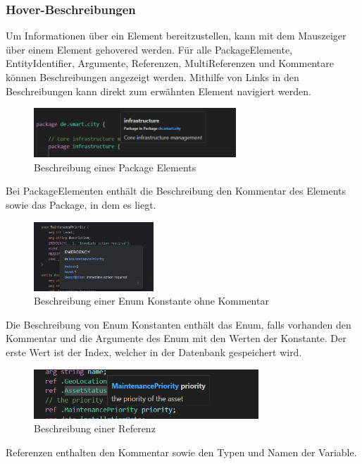 \documentclass[./einleitung.tex]{subfiles}
\begin{document}
    \subsubsection{Hover-Beschreibungen}\label{subsubsec:useHover}
    Um Informationen über ein Element bereitzustellen, kann mit dem Mauszeiger über einem Element gehovered werden.
    Für alle PackageElemente, EntityIdentifier, Argumente, Referenzen, MultiReferenzen und Kommentare können Beschreibungen angezeigt werden.
    Mithilfe von Links in den Beschreibungen kann direkt zum erwähnten Element navigiert werden.
    \begin{figure}[H]
        \centering
        \includegraphics[height=5em]{bilder/hover-package}
        \caption{Beschreibung eines Package Elements}
        \label{fig:hover-package}
    \end{figure}
    Bei PackageElementen enthält die Beschreibung den Kommentar des Elements sowie das Package, in dem es liegt.
    \begin{figure}[H]
        \centering
        \includegraphics[height=7em]{bilder/hover-enum-entry}
        \caption{Beschreibung einer Enum Konstante ohne Kommentar}
        \label{fig:hover-enum-entry}
    \end{figure}
    Die Beschreibung von Enum Konstanten enthält das Enum, falls vorhanden den Kommentar und die Argumente des Enum mit den Werten der Konstante.
    Der erste Wert ist der Index, welcher in der Datenbank gespeichert wird.
    \begin{figure}[H]
        \centering
        \includegraphics[height=5em]{bilder/hover-referenz}
        \caption{Beschreibung einer Referenz}
        \label{fig:hover-referenzen}
    \end{figure}
    Referenzen enthalten den Kommentar sowie den Typen und Namen der Variable.
\end{document}
